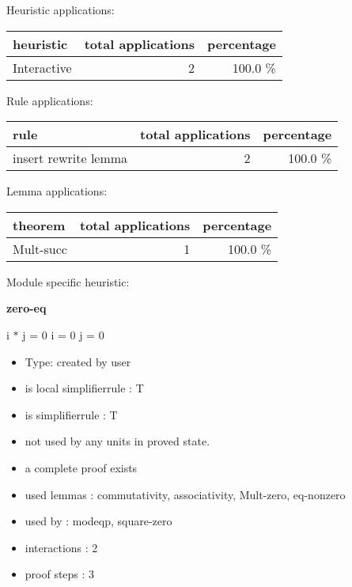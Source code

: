 \documentclass[a4paper]{article}
\begin{document}
\medskip


Heuristic applications:

\begin{supertabular}{l|r|r}
heuristic	& total applications & percentage \\ \hline
Interactive & 2 & 100.0 \% \\

\end{supertabular}

Rule applications:

\begin{supertabular}{l|r|r}
rule	        & total applications & percentage \\ \hline
insert rewrite lemma & 2 & 100.0 \% \\

\end{supertabular}

Lemma applications:

\begin{supertabular}{l|r|r}
theorem	        & total applications & percentage \\ \hline
Mult-succ & 1 & 100.0 \% \\

\end{supertabular}

Module specific heuristic:

\pagebreak

{\LARGE\bf zero-eq}\label{lemma-zero-eq}

\medskip

 \Fol i $*$ j = 0 \Equiv i = 0 \Or j = 0

\begin{itemize}

\item Type: created by user

\item is local simplifierrule : T
\item is simplifierrule : T
\item not used by any units in proved state.
\item       a complete proof exists
\item       used lemmas  : commutativity, associativity, Mult-zero, eq-nonzero
\item       used by      : modeqp, square-zero
\item       interactions : 2
\item       proof steps  : 3
\end{itemize}
\end{document}
